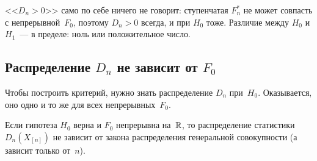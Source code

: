 \begin{remark}
  <<$D_n > 0$>> само по себе ничего не говорит: ступенчатая $F_n^*$ не может совпасть
  с непрерывной~$F_0$, поэтому $D_n > 0$ всегда, и при $H_0$ тоже.
  Различие между $H_0$ и $H_1$~--- в пределе: ноль или положительное число.
\end{remark}

\subsection{Распределение \texorpdfstring{$D_n$}{Dn} не зависит от \texorpdfstring{$F_0$}{F0}}
\label{lec05:distribution-free}

Чтобы построить критерий, нужно знать распределение $D_n$ при~$H_0$. Оказывается,
оно одно и то же для всех непрерывных~$F_0$.

\begin{lemma}
  \label{lec05:lemma}
  Если гипотеза $H_0$ верна и $F_0$ непрерывна на~$\mathbb{R}$, то распределение статистики
  $D_n(X_{[n]})$ не зависит от закона распределения генеральной совокупности
  (а зависит только от~$n$).
\end{lemma}

